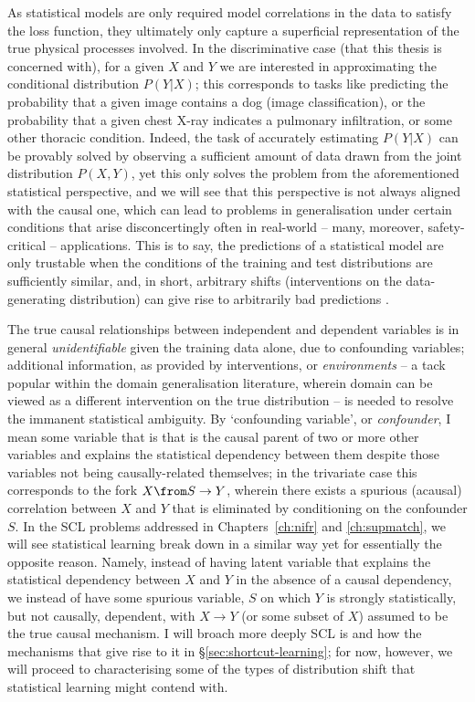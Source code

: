 As statistical models are only required model correlations in the data to satisfy the loss
function, they ultimately only capture a superficial representation of the true physical processes
involved.
%
%
In the discriminative case (that this thesis is concerned with), for a given \( X \) and \( Y \) we
are interested in approximating the conditional distribution \( P(Y|X) \); this  corresponds to
tasks like predicting the probability that a given image contains a dog (image classification), or
the probability that a given chest X-ray indicates a pulmonary infiltration, or some other thoracic
condition.
%
Indeed, the task of accurately estimating \( P(Y | X) \) can be provably solved by observing a
sufficient amount of \iid{} data drawn from the joint distribution \( P(X,Y) \), yet this only
solves the problem from the aforementioned statistical perspective, and we will see that this
perspective is not always aligned with the causal one, which can lead to problems in generalisation
under certain conditions that arise disconcertingly often in real-world -- many, moreover,
safety-critical -- applications.
%
This is to say, the predictions of a statistical model are only trustable when the conditions of
the training and test distributions are sufficiently similar, and, in short, arbitrary shifts
(interventions on the data-generating distribution) can give rise to arbitrarily bad predictions
\citep{pearl2009causality, scholkopf2012causal}.

The true causal relationships between independent and dependent variables is in general
\emph{unidentifiable} given the training data alone, due to confounding variables; additional
information, as provided by interventions, or \emph{environments} \citep{peters2016causal} -- a
tack popular within the domain generalisation literature, wherein domain can be viewed as a
different intervention on the true distribution -- is needed to resolve the immanent statistical
ambiguity.
%
By `confounding variable', or \emph{confounder}, I mean some variable that is that is the causal
parent of two or more other variables and explains the statistical dependency between them despite
those variables not being causally-related themselves; in the trivariate case this corresponds to
the fork \(X \from S \to Y \), wherein there exists a spurious (acausal) correlation between \(X\)
and \(Y\) that is eliminated by conditioning on the confounder \(S\).
%
%
In the \ac{SCL} problems addressed in Chapters~\ref{ch:nifr} and \ref{ch:supmatch}, we will see
statistical learning break down in a similar way yet for essentially the opposite reason.
%
Namely, instead of having latent variable that explains the statistical dependency between \(X\)
and \(Y\) in the absence of a causal dependency, we instead of have some spurious variable, \(S\)
on which \(Y\) is strongly statistically, but not causally, dependent, with \(X \to Y \) (or some
subset of \(X\)) assumed to be the true causal mechanism.
%
I will broach more deeply \ac{SCL} is and how the mechanisms that give rise to it in
\S\ref{sec:shortcut-learning};
%
for now, however, we will proceed to characterising some of the types of distribution shift that
statistical learning might contend with.

